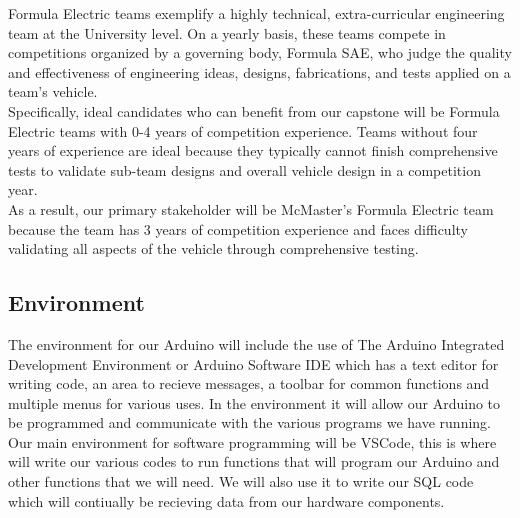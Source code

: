 \documentclass{article}
\begin{document}
Formula Electric teams exemplify a highly technical, extra-curricular engineering team at the University level. On a yearly basis, these teams compete in competitions organized by a governing body, Formula SAE, who judge the quality and effectiveness of engineering ideas, designs, fabrications, and tests applied on a team's vehicle. \\

Specifically, ideal candidates who can benefit from our capstone will be Formula Electric teams with 0-4 years of competition experience. Teams without four years of experience are ideal because they typically cannot finish comprehensive tests to  validate sub-team designs and overall vehicle design in a competition year. \\

As a result, our primary stakeholder will be McMaster's Formula Electric team because the team has 3 years of competition experience and faces difficulty validating all aspects of the vehicle through comprehensive testing.




\subsection{Environment}

The environment for our Arduino will include the use of The Arduino Integrated Development Environment or Arduino Software IDE which has a text editor for writing code, an area to recieve messages, a toolbar for common functions and multiple menus for various uses. In the environment it will allow our Arduino to be programmed and communicate with the various programs we have running. \\

Our main environment for software programming will be VSCode, this is where will write our various codes to run functions that will program our Arduino and other functions that we will need. We will also use it to write our SQL code which will contiually be recieving data from our hardware components.


\end{document}
